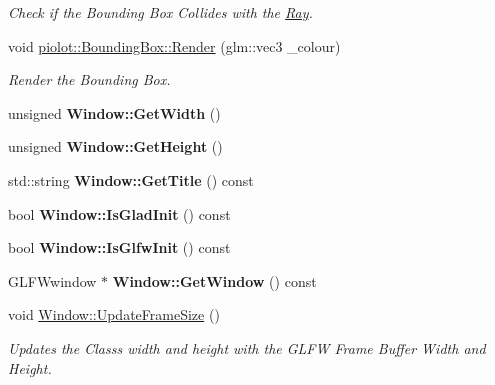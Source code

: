 \begin{DoxyCompactItemize}
\begin{DoxyCompactList}\small\item\em Check if the Bounding Box Collides with the \mbox{\hyperlink{classpiolot_1_1_ray}{Ray}}. \end{DoxyCompactList}\item 
void \mbox{\hyperlink{group___getters_ga3ef9f966674be7fa0448d388b7a3d776}{piolot\+::\+Bounding\+Box\+::\+Render}} (glm\+::vec3 \+\_\+colour)
\begin{DoxyCompactList}\small\item\em Render the Bounding Box. \end{DoxyCompactList}\item 
\mbox{\label{group___getters_ga77d5347666653b9a20c389e0e412f700}} 
unsigned {\bfseries Window\+::\+Get\+Width} ()
\item 
\mbox{\label{group___getters_ga19c8d97415b163e5f641388f1d537085}} 
unsigned {\bfseries Window\+::\+Get\+Height} ()
\item 
\mbox{\label{group___getters_gae66865d49d16710c1cb11fd39ab7564f}} 
std\+::string {\bfseries Window\+::\+Get\+Title} () const
\item 
\mbox{\label{group___getters_gacd18a545a32f73ae1dc0c1bd00573f20}} 
bool {\bfseries Window\+::\+Is\+Glad\+Init} () const
\item 
\mbox{\label{group___getters_ga84c80356e911db086098e29e8a870829}} 
bool {\bfseries Window\+::\+Is\+Glfw\+Init} () const
\item 
\mbox{\label{group___getters_gad7e49197526473b23c01ecc9cd2292d2}} 
G\+L\+F\+Wwindow $\ast$ {\bfseries Window\+::\+Get\+Window} () const
\item 
void \mbox{\hyperlink{group___getters_gac825ddc0aeda29fae94c5fc910f3f04d}{Window\+::\+Update\+Frame\+Size}} ()
\begin{DoxyCompactList}\small\item\em Updates the Class\textquotesingle{}s width and height with the G\+L\+FW Frame Buffer Width and Height. \end{DoxyCompactList}\item 
\mbox{\label{group___getters_ga6703058dead0231b089862ad1e226c70}} 

\end{DoxyCompactItemize}
